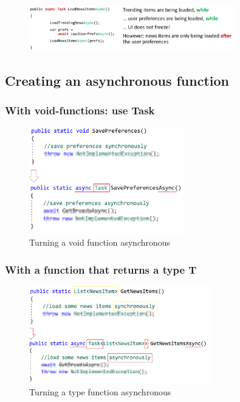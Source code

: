 \documentclass{article}
\begin{document}
\begin{figure}[H]
    \centering
    \includegraphics[width=0.8\textwidth]{async-news-solution2.png}
    \caption{}
\end{figure}

\subsection{Creating an asynchronous function}

\subsubsection{With void-functions: use Task}

\begin{figure}[H]
    \centering
    \includegraphics[width=0.6\textwidth]{async-void.png}
    \caption{Turning a void function asynchronous}
\end{figure}

\subsubsection{With a function that returns a type T}

\begin{figure}[H]
    \centering
    \includegraphics[width=0.7\textwidth]{async-type.png}
    \caption{Turning a type function asynchronous}
\end{figure}
\end{document}
